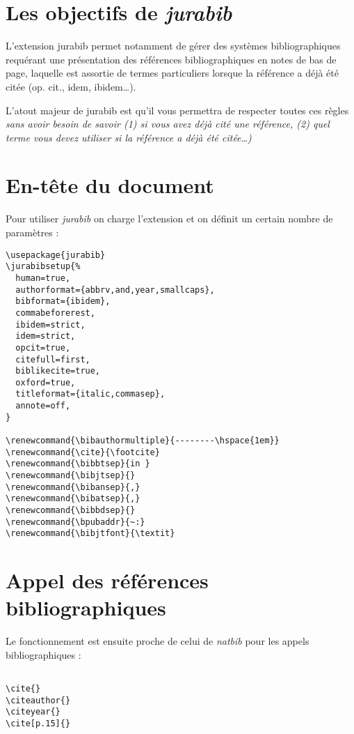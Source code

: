 
\section{Les objectifs de \emph{jurabib}}


L'extension jurabib permet notamment de gérer des systèmes
bibliographiques requérant une présentation des références
bibliographiques en notes de bas de page, laquelle est assortie de
termes particuliers lorsque la référence a déjà été citée (op. cit.,
idem, ibidem\ldots).

L'atout majeur de jurabib est qu'il vous permettra de respecter toutes
ces règles \emph{sans avoir besoin de savoir (1) si vous avez déjà
  cité une référence, (2) quel terme vous devez utiliser si la
  référence a déjà été citée\ldots)}


\section{En-tête du document}

Pour utiliser \emph{jurabib} on charge l'extension et on définit un
certain nombre de paramètres :


\begin{small}
\begin{verbatim}
\usepackage{jurabib}
\jurabibsetup{%
  human=true,
  authorformat={abbrv,and,year,smallcaps},
  bibformat={ibidem},
  commabeforerest,
  ibidem=strict,
  idem=strict,
  opcit=true,
  citefull=first,
  biblikecite=true,
  oxford=true,
  titleformat={italic,commasep},
  annote=off,
}

\renewcommand{\bibauthormultiple}{--------\hspace{1em}}
\renewcommand{\cite}{\footcite}
\renewcommand{\bibbtsep}{in }
\renewcommand{\bibjtsep}{}
\renewcommand{\bibansep}{,}
\renewcommand{\bibatsep}{,}
\renewcommand{\bibbdsep}{}
\renewcommand{\bpubaddr}{~:}
\renewcommand{\bibjtfont}{\textit}
\end{verbatim}
\end{small}



\section{Appel des références bibliographiques}

Le fonctionnement est ensuite proche de celui de \emph{natbib} pour
les appels bibliographiques :


\begin{verbatim}

\cite{}
\citeauthor{}
\citeyear{}
\cite[p.15]{}

\end{verbatim}




